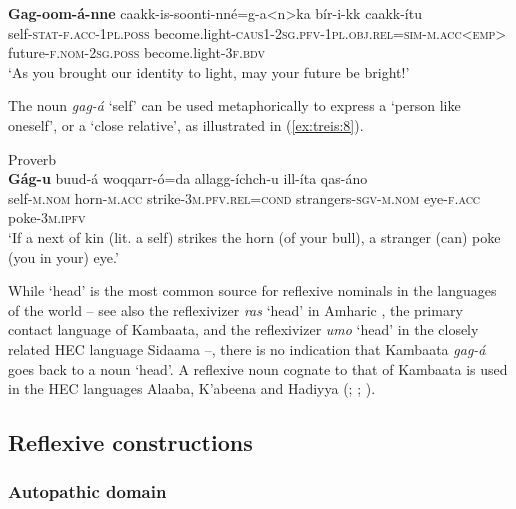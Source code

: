 \documentclass[output=paper]{langscibook}
\begin{document}
\ea\label{ex:treis:7} 
\gll \textbf{Gag-oom-á-nne} caakk-is-soonti-nné=g-a<n>ka bír-i-kk caakk-ítu\\
     self-\textsc{stat-f.acc-1pl.poss} become.light-\textsc{caus1-2sg.pfv-1pl.obj.rel=sim-m.acc<emp>} future-\textsc{f.nom-2sg.poss} become.light-3\textsc{f.bdv}\\
\glt ‘As you brought our identity to light, may your future be bright!’ \citep[4]{AdaneNodate}\z

The noun \textit{gag-á} ‘self’ can be used metaphorically to express a ‘person like oneself’, or a ‘close relative’, as illustrated in (\ref{ex:treis:8}).

\ea\label{ex:treis:8} Proverb \\
\gll \textbf{Gág-u} buud-á woqqarr-ó=da allagg-íchch-u ill-íta qas-áno\\
     self-\textsc{m.nom} horn-\textsc{m.acc} strike-\textsc{3m.pfv.rel=cond} strangers-\textsc{sgv-m.nom} eye-\textsc{f.acc} poke-\textsc{3m.ipfv}\\
\glt ‘If a next of kin (lit. a self) strikes the horn (of your bull), a stranger (can) poke (you in your) eye.’ \citep[52]{AlamuAlamayo2017}
\z

While ‘head’ is the most common source for reflexive nominals in the languages of the world \citep{Schladt1999} – see also the reflexivizer \textit{ras} ‘head’ in Amharic \citep[57-58]{Leslau1995}, the primary contact language of Kambaata, and the reflexivizer \textit{umo} ‘head’ in the closely related HEC language Sidaama \citep[184-187]{Kawachi2007} –, there is no indication that Kambaata \textit{gag-á} goes back to a noun ‘head’. A reflexive noun cognate to that of Kambaata is used in the HEC languages Alaaba, K’abeena and Hadiyya (\citealt[188-199]{Schneider-Blum2007}; \citealt[257-259]{Crass2005}; \citealt[90-91]{Tadesse2015}).

\subsection{Reflexive constructions}\label{sec:treis:3.2}
\subsubsection{Autopathic domain}\label{sec:treis:3.2.1}
\end{document}
